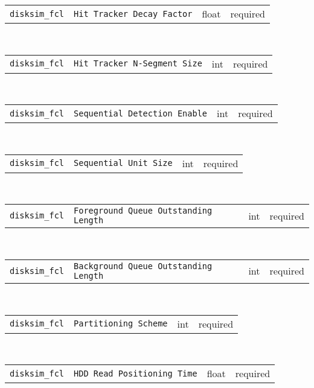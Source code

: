 \noindent 
\begin{tabular}{|p{\lpmodwidth}|p{\lpnamewidth}|p{0.5in}|p{0.5in}|}
\cline{1-4}
\texttt{disksim\_fcl} & \texttt{Hit Tracker Decay Factor} & float & required \\ 
\cline{1-4}
\end{tabular}\\ 
\noindent 
\begin{tabular}{|p{\lpmodwidth}|p{\lpnamewidth}|p{0.5in}|p{0.5in}|}
\cline{1-4}
\texttt{disksim\_fcl} & \texttt{Hit Tracker N-Segment Size} & int & required \\ 
\cline{1-4}
\end{tabular}\\ 
\noindent 
\begin{tabular}{|p{\lpmodwidth}|p{\lpnamewidth}|p{0.5in}|p{0.5in}|}
\cline{1-4}
\texttt{disksim\_fcl} & \texttt{Sequential Detection Enable} & int & required \\ 
\cline{1-4}
\end{tabular}\\ 
\noindent 
\begin{tabular}{|p{\lpmodwidth}|p{\lpnamewidth}|p{0.5in}|p{0.5in}|}
\cline{1-4}
\texttt{disksim\_fcl} & \texttt{Sequential Unit Size} & int & required \\ 
\cline{1-4}
\end{tabular}\\ 
\noindent 
\begin{tabular}{|p{\lpmodwidth}|p{\lpnamewidth}|p{0.5in}|p{0.5in}|}
\cline{1-4}
\texttt{disksim\_fcl} & \texttt{Foreground Queue Outstanding Length} & int & required \\ 
\cline{1-4}
\end{tabular}\\ 
\noindent 
\begin{tabular}{|p{\lpmodwidth}|p{\lpnamewidth}|p{0.5in}|p{0.5in}|}
\cline{1-4}
\texttt{disksim\_fcl} & \texttt{Background Queue Outstanding Length} & int & required \\ 
\cline{1-4}
\end{tabular}\\ 
\noindent 
\begin{tabular}{|p{\lpmodwidth}|p{\lpnamewidth}|p{0.5in}|p{0.5in}|}
\cline{1-4}
\texttt{disksim\_fcl} & \texttt{Partitioning Scheme} & int & required \\ 
\cline{1-4}
\end{tabular}\\ 
\noindent 
\begin{tabular}{|p{\lpmodwidth}|p{\lpnamewidth}|p{0.5in}|p{0.5in}|}
\cline{1-4}
\texttt{disksim\_fcl} & \texttt{HDD Read Positioning Time} & float & required \\ 
\cline{1-4}
\end{tabular}\\ 
